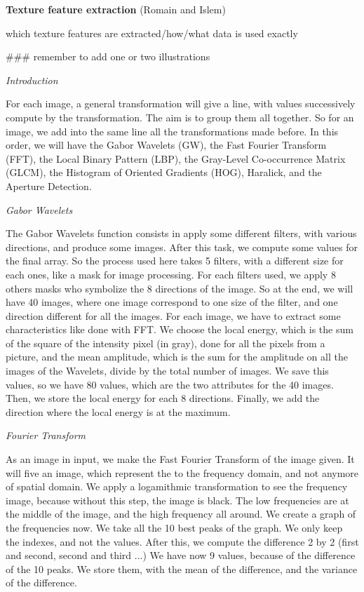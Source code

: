 \textbf{Texture feature extraction} (Romain and Islem)

which texture features are extracted/how/what data is used exactly

### remember to add one or two illustrations 

    \textit{Introduction}
    
For each image, a general transformation will give a line, with values successively compute by the transformation. The aim is to group them all together. So for an image, we add into the same line all the transformations made before. In this order, we will have the Gabor Wavelets (GW), the Fast Fourier Transform (FFT), the Local Binary Pattern (LBP), the Gray-Level Co-occurrence Matrix (GLCM), the Histogram of Oriented Gradients (HOG), Haralick, and the Aperture Detection.

    \textit{Gabor Wavelets}

The Gabor Wavelets function consists in apply some different filters, with various directions, and produce some images. After this task, we compute some values for the final array. So the process used here takes 5 filters, with a different size for each ones, like a mask for image processing. For each filters used, we apply 8 others masks who symbolize the 8 directions of the image. So at the end, we will have 40 images, where one image correspond to one size of the filter, and one direction different for all the images. For each image, we have to extract some characteristics like done with FFT. We choose the local energy, which is the sum of the square of the intensity pixel (in gray), done for all the pixels from a picture, and the mean amplitude, which is the sum for the amplitude on all the images of the Wavelets, divide by the total number of images. We save this values, so we have 80 values, which are the two attributes for the 40 images. Then, we store the local energy for each 8 directions. Finally, we add the direction where the local energy is at the maximum.

    \textit{Fourier Transform}

As an image in input, we make the Fast Fourier Transform of the image given. It will five an image, which represent the to the frequency domain, and not anymore of spatial domain. We apply a logamithmic transformation to see the frequency image, because without this step, the image is black. The low frequencies are at the middle of the image, and the high frequency all around. We create a graph of the frequencies now. We take all the 10 best peaks of the graph. We only keep the indexes, and not the values. After this, we compute the difference 2 by 2 (first and second, second and third ...) We have now 9 values, because of the difference of the 10 peaks. We store them, with the mean of the difference, and the variance of the difference.
    
    
    
    
    
    